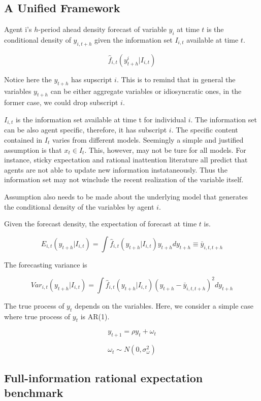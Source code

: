 \documentclass[]{article}
\begin{document}
\subsection{A Unified Framework}

Agent i's $h$-period ahead density forecast of variable $y_i$ at time $t$ is the conditional density of $y_{i,t+h}$ given the information set $I_{i,t}$ available at time $t$. 

$$\widehat f_{i,t}(y^i_{t+h}|I_{i,t})$$

Notice here the $y_{t+h}$ has supscript $i$. This is to remind that in general the variables $y_{t+h}$ can be either aggregate variables or idiosyncratic ones, in the former case, we could drop subscript $i$.  

$I_{i,t}$ is the information set available at time t for individual $i$. The information set can be also agent specific, therefore, it has subscript $i$.  The specific content contained in $I_t$ varies from different models. Seemingly a simple and justified assumption is that $x_t \in  I_t$. This, however, may not be ture for all models. For instance, sticky expectation and rational inattention literature all predict that agents are not able to update new information instataneously. Thus the information set may not winclude the recent realization of the variable itself.  

Assumption also needs to be made about the underlying model that generates the conditional density of the variables by agent $i$. 

Given the forecast density, the expectation of forecast at time $t$ is. 

$$E_{i,t}(y_{t+h}|I_{i,t}) =\int \widehat f_{i,t}(y_{t+h}|I_{i,t})y_{t+h} d y_{t+h}\equiv \bar y_{i,t,t+h}$$

The forecasting variance is 

$$Var_{i,t}(y_{t+h}|I_{i,t})=\int \widehat f_{i,t}(y_{t+h}|I_{i,t}) (y_{t+h} - \bar y_{i,t,t+h})^2d y_{t+h}$$

The true process of $y_{t}$ depends on the variables. Here, we consider a simple case where true process of $y_t$ is AR(1). 

$$y_{t+1} = \rho y_t + \omega_t$$

$$\omega_t \sim N(0,\sigma^2_{\omega})$$

\subsection{Full-information rational expectation benchmark }
\end{document}
